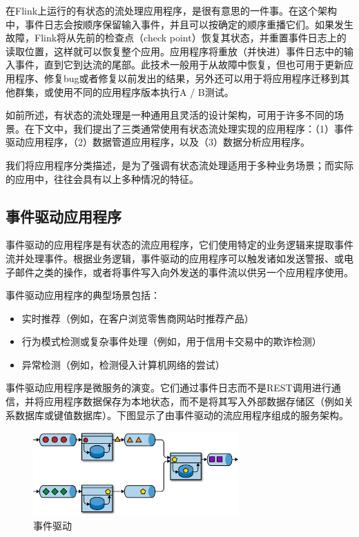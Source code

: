 \documentclass[cn,11pt,chinese]{elegantbook}
\begin{document}
在Flink上运行的有状态的流处理应用程序，是很有意思的一件事。在这个架构中，事件日志会按顺序保留输入事件，并且可以按确定的顺序重播它们。如果发生故障，Flink将从先前的检查点（check point）恢复其状态，并重置事件日志上的读取位置，这样就可以恢复整个应用。应用程序将重放（并快进）事件日志中的输入事件，直到它到达流的尾部。此技术一般用于从故障中恢复，但也可用于更新应用程序、修复bug或者修复以前发出的结果，另外还可以用于将应用程序迁移到其他群集，或使用不同的应用程序版本执行A / B测试。

如前所述，有状态的流处理是一种通用且灵活的设计架构，可用于许多不同的场景。在下文中，我们提出了三类通常使用有状态流处理实现的应用程序：（1）事件驱动应用程序，（2）数据管道应用程序，以及（3）数据分析应用程序。

我们将应用程序分类描述，是为了强调有状态流处理适用于多种业务场景；而实际的应用中，往往会具有以上多种情况的特征。

\subsection{事件驱动应用程序}

事件驱动的应用程序是有状态的流应用程序，它们使用特定的业务逻辑来提取事件流并处理事件。根据业务逻辑，事件驱动的应用程序可以触发诸如发送警报、或电子邮件之类的操作，或者将事件写入向外发送的事件流以供另一个应用程序使用。

事件驱动应用程序的典型场景包括：

\begin{itemize}
    \item 实时推荐（例如，在客户浏览零售商网站时推荐产品）
    \item 行为模式检测或复杂事件处理（例如，用于信用卡交易中的欺诈检测）
    \item 异常检测（例如，检测侵入计算机网络的尝试）
\end{itemize}

事件驱动应用程序是微服务的演变。它们通过事件日志而不是REST调用进行通信，并将应用程序数据保存为本地状态，而不是将其写入外部数据存储区（例如关系数据库或键值数据库）。下图显示了由事件驱动的流应用程序组成的服务架构。

\begin{figure}[htbp]
  \centering
  \includegraphics[width=0.7\textwidth]{images/spaf_0105.png}
  \caption{事件驱动}
\end{figure}
\end{document}
